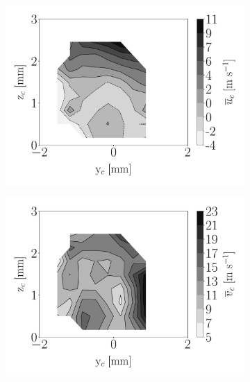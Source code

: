 \begin{figure}[h!]
\begin{subfigure}[b]{0.3\textwidth}
	\centering
   \includegraphics[scale=\scaleSLIBIMER]{./part3_applications/figures_ch8_resolved/injectors_SLI/dx15_xD05p00_ux_mean_map}
\end{subfigure}
   \hspace{0.17in}
\begin{subfigure}[b]{0.3\textwidth}
	\centering
   \includegraphics[scale=\scaleSLIBIMER]{./part3_applications/figures_ch8_resolved/injectors_SLI/dx15_xD05p00_uy_mean_map}
\end{subfigure}
   \hspace{0.17in}

\end{figure}
